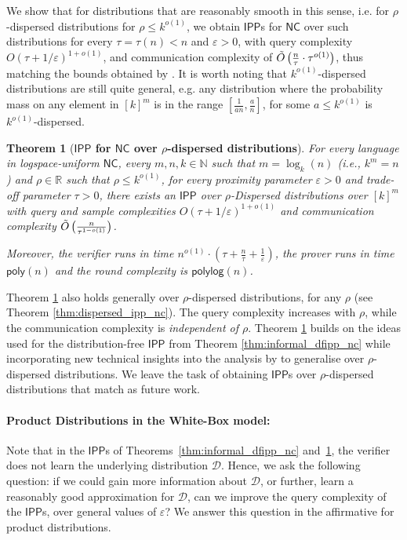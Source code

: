 \documentclass[11pt]{article}
\newtheorem{theorem}{Theorem}[section]
\newcommand{\poly}{\mathsf{poly}}
\newcommand{\polylog}{\mathsf{polylog}}
\newcommand{\NC}{\mathsf{NC}}
\newcommand{\IPP}{\mathsf{IPP}}
\newcommand{\N}{\mathbb{N}}
\newcommand{\R}{\mathbb{R}}
\newcommand{\sD}{\mathcal{D}}
\newcommand{\eps}{\varepsilon}
\begin{document}
We show that for distributions that are reasonably smooth in this sense, i.e. for $\rho$-dispersed distributions for $\rho \leq k^{o(1)}$, we obtain  $\IPP$s for $\NC$ over such distributions for every $\tau=\tau(n)<n$ and $\varepsilon > 0$, with query complexity $O(\tau + 1/\eps)^{1+o(1)}$, and communication complexity of $\Tilde{O}\left(\frac{n}{\tau}\cdot \tau^{o(1)}\right)$, thus matching the bounds obtained by \cite{RVW}. It is worth noting that $k^{o(1)}$-dispersed distributions are still quite general, e.g. any distribution where the probability mass on any element in $[k]^m$ is in the range $\left[\frac{1}{an}, \frac{a}{n}\right]$, for some $a \leq k^{o(1)}$ is $k^{o(1)}$-dispersed. 

\begin{theorem}[\textbf{$\IPP$ for $\NC$ over $\rho$-dispersed distributions}]
    \label{thm:informal_ipp_dispersed}
    For every language in logspace-uniform $\NC$, every $m,n,k \in \N$ such that $m = \log_k(n)$ (i.e., $k^m = n$) and $\rho \in \R$ such that $\rho \leq k^{o(1)}$, for every proximity parameter $\eps > 0$ and trade-off parameter $\tau>0$,  there exists an $\IPP$ over $\rho$-Dispersed distributions over $[k]^m$ with query and sample complexities $O(\tau+ 1/\eps)^{1+o(1)}$ and communication complexity $\Tilde{O} \left( \frac{n}{\tau^{1-o(1)}}\right)$. 
    
    Moreover, the verifier runs in time $n^{o(1)} \cdot \left(\tau + \frac{n}{\tau} +\frac{1}{\eps}\right)$, the prover runs in time $\poly(n)$ and the round complexity is $\polylog(n)$.
\end{theorem}

Theorem \ref{thm:informal_ipp_dispersed} also holds generally over $\rho$-dispersed distributions, for any $\rho$ (see Theorem \ref{thm:dispersed_ipp_nc}). The query complexity increases with $\rho$, while the communication complexity is \textit{independent of $\rho$}. Theorem \ref{thm:informal_ipp_dispersed} builds on the ideas used for the distribution-free $\IPP$ from Theorem \ref{thm:informal_dfipp_nc} while incorporating new technical insights into the analysis by \cite{RVW} to generalise over $\rho$-dispersed distributions. We leave the task of obtaining $\IPP$s over $\rho$-dispersed distributions that match \cite{RR20_batch_polylog} as future work.

\paragraph{Product Distributions in the White-Box model:}
Note that in the $\IPP$s of Theorems~\ref{thm:informal_dfipp_nc} and~\ref{thm:informal_ipp_dispersed}, the verifier does not learn the underlying distribution $\sD$. Hence, we ask the following question: if we could gain more information about $\sD$, or further, learn a reasonably good approximation for $\sD$, can we improve the query complexity of the $\IPP$s, over general values of $\varepsilon$? We answer this question in the affirmative for product distributions.
\end{document}
